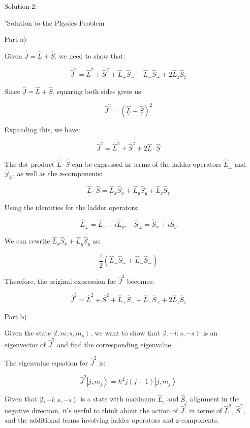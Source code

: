 Solution 2:

"Solution to the Physics Problem

Part a)

Given \( \hat{\underline{J}} = \hat{\underline{L}} + \hat{\underline{S}} \), we need to show that:

\[
\hat{J}^2 = \hat{L}^2 + \hat{S}^2 + \hat{L}_{+}\hat{S}_{-} + \hat{L}_{-}\hat{S}_{+} + 2\hat{L}_{z}\hat{S}_{z}
\]

Since \( \hat{\underline{J}} = \hat{\underline{L}} + \hat{\underline{S}} \), squaring both sides gives us:

\[
\hat{J}^2 = (\hat{\underline{L}} + \hat{\underline{S}})^2
\]

Expanding this, we have:

\[
\hat{J}^2 = \hat{L}^2 + \hat{S}^2 + 2\hat{\underline{L}}\cdot\hat{\underline{S}}
\]

The dot product \( \hat{\underline{L}}\cdot\hat{\underline{S}} \) can be expressed in terms of the ladder operators \( \hat{L}_{\pm} \) and \( \hat{S}_{\pm} \), as well as the z-components:

\[
\hat{\underline{L}}\cdot\hat{\underline{S}} = \hat{L}_{x}\hat{S}_{x} + \hat{L}_{y}\hat{S}_{y} + \hat{L}_{z}\hat{S}_{z}
\]

Using the identities for the ladder operators:

\[
\hat{L}_{\pm} = \hat{L}_{x} \pm i\hat{L}_{y}, \quad \hat{S}_{\pm} = \hat{S}_{x} \pm i\hat{S}_{y}
\]

We can rewrite \( \hat{L}_{x}\hat{S}_{x} + \hat{L}_{y}\hat{S}_{y} \) as:

\[
\frac{1}{2}(\hat{L}_{+}\hat{S}_{-} + \hat{L}_{-}\hat{S}_{+})
\]

Therefore, the original expression for \( \hat{J}^2 \) becomes:

\[
\hat{J}^2 = \hat{L}^2 + \hat{S}^2 + \hat{L}_{+}\hat{S}_{-} + \hat{L}_{-}\hat{S}_{+} + 2\hat{L}_{z}\hat{S}_{z}
\]

Part b)

Given the state \( \left|l, m; s, m_{s} \right> \), we want to show that \( \left|l, -l; s, -s \right> \) is an eigenvector of \( \hat{J}^2 \) and find the corresponding eigenvalue.

The eigenvalue equation for \( \hat{J}^2 \) is:

\[
\hat{J}^2\left|j, m_j \right> = \hbar^2 j(j+1)\left|j, m_j \right>
\]

Given that \( \left|l, -l; s, -s \right> \) is a state with maximum \( \hat{L}_{z} \) and \( \hat{S}_{z} \) alignment in the negative direction, it's useful to think about the action of \( \hat{J}^2 \) in terms of \( \hat{L}^2 \), \( \hat{S}^2 \), and the additional terms involving ladder operators and z-components.

